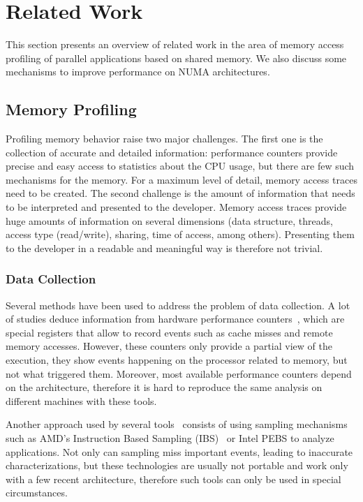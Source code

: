 
\section{Related Work}
\label{sec:soa}

This section presents an overview of related work in the area of memory access profiling of parallel applications based on shared memory.
We also discuss some mechanisms to improve performance on NUMA architectures.

\subsection{Memory Profiling}
\label{sec:soa-profiling}

Profiling memory behavior raise two major challenges.
The first one is the collection of accurate and detailed information: performance counters provide precise and easy access to statistics about the CPU usage, but there are few such mechanisms for the memory.
For a maximum level of detail, memory access traces need to be created.
The second challenge is the amount of information that needs to be interpreted and presented to the developer.
Memory access traces provide huge amounts of information on several dimensions (data structure, threads, access type (read/write), sharing, time of access, among others).
Presenting them to the developer in a readable and meaningful way is therefore not trivial.

\subsubsection{Data Collection}

Several methods have been used to address the problem of data collection. A
lot of studies deduce information from hardware performance
counters~\cite{Majo13(Mis)understanding,
Jiang14Understanding,Bosch00Rivet,Weyers14Visualization,Tao01Visualizing,DeRose01Hardware},
which are special registers that allow to record events such as cache misses and remote
memory accesses. However, these counters only provide a partial
view of the execution, they show events happening on the processor related to
memory, but not what triggered them. Moreover, most available performance counters
depend on the architecture, therefore it is hard to reproduce the same
analysis on different machines with these tools.


Another approach used by several
tools~\cite{Lachaize12MemProf,McCurdy2010,Liu14Tool,Gimenez14Dissecting}
consists of using sampling mechanisms such as AMD's Instruction Based Sampling
(IBS)~\cite{Drongowski07Instructionbased} or Intel PEBS to analyze applications. Not only can sampling miss important events, leading to
inaccurate characterizations, but these technologies are usually not portable and work
only with a few recent architecture, therefore such tools can only be used in
special circumstances.

